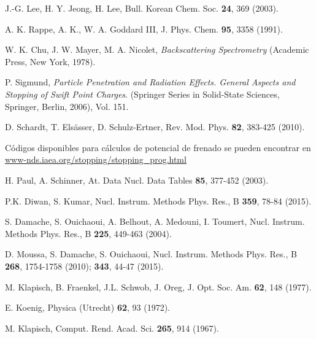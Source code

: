 \begin{thebibliography}{9}
J.-G. Lee, H. Y. Jeong, H. Lee, 
Bull. Korean Chem. Soc. \textbf{24}, 369 (2003).

A. K. Rappe, A. K., W. A. Goddard III,
J. Phys. Chem. \textbf{95}, 3358 (1991).




W. K. Chu, J. W. Mayer, M. A. Nicolet,
\textit{Backscattering Spectrometry}
(Academic Press, New York, 1978).

P. Sigmund, 
\textit{Particle Penetration and Radiation Effects. General Aspects and 
Stopping of Swift Point Charges}.
(Springer Series in Solid-State Sciences, Springer, Berlin, 2006), Vol. 151.

D. Schardt, T. Els\"asser, D. Schulz-Ertner, 
Rev. Mod. Phys. \textbf{82},  383-425 (2010).

Códigos disponibles para cálculos de potencial de frenado se pueden 
encontrar en \href{https://www-nds.iaea.org/stopping/stopping\_prog.html}
{www-nds.iaea.org/stopping/stopping\_prog.html}

H. Paul, A. Schinner,
At. Data Nucl. Data Tables  \textbf{85}, 377-452 (2003).

P.K. Diwan, S. Kumar, 
Nucl. Instrum. Methods Phys. Res., B \textbf{359}, 78-84 (2015).

S. Damache, S. Ouichaoui, A. Belhout, A. Medouni, I. Toumert, 
Nucl. Instrum. Methods Phys. Res., B \textbf{225}, 449-463 (2004).

D. Moussa, S. Damache, S. Ouichaoui, 
Nucl. Instrum. Methods Phys. Res., B \textbf{268}, 1754-1758 (2010); 
\textbf{343},  44-47 (2015).

M. Klapisch, B. Fraenkel, J.L. Schwob, J. Oreg,
J. Opt. Soc. Am. \textbf{62}, 148 (1977).

E. Koenig,
Physica (Utrecht) \textbf{62}, 93 (1972).

M. Klapisch,
Comput. Rend. Acad. Sci. \textbf{265}, 914 (1967).


\end{thebibliography}
